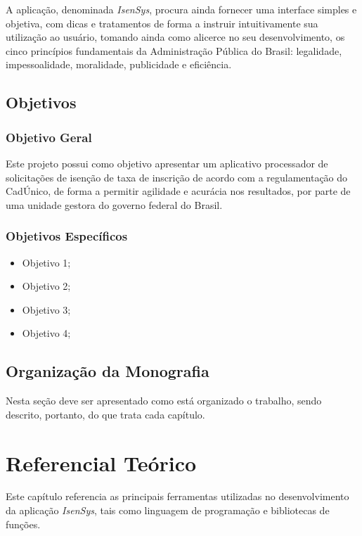 \documentclass[
	12pt,			%
	openright,		%
	oneside,	
	a4paper,		%
	english,		%
	brazil			%
]{abntex2/abntex2}  %
\begin{document}
	A aplicação, denominada \textit{IsenSys}, procura ainda fornecer uma interface simples e objetiva, com dicas e tratamentos de forma a instruir intuitivamente sua utilização ao usuário, tomando ainda como alicerce no seu desenvolvimento, os cinco princípios fundamentais da Administração Pública do Brasil: legalidade, impessoalidade, moralidade, publicidade e eficiência.

	\section{Objetivos}
	
		\subsection{Objetivo Geral}
		
		Este projeto possui como objetivo apresentar um aplicativo processador de solicitações de isenção de taxa de inscrição de acordo com a regulamentação do CadÚnico, de forma a permitir agilidade e acurácia nos resultados, por parte de uma unidade gestora do governo federal do Brasil.
		
		\subsection{Objetivos Específicos}
		
		\begin{itemize}
			
			\item Objetivo 1;
			\item Objetivo 2;
			\item Objetivo 3;
			\item Objetivo 4;
			
		\end{itemize}
		
	\section{Organização da Monografia}
	
		Nesta seção deve ser apresentado como está organizado o trabalho, sendo descrito, portanto, do que trata cada capítulo.

\chapter{Referencial Teórico}

	Este capítulo referencia as principais ferramentas utilizadas no desenvolvimento da aplicação \textit{IsenSys}, tais como linguagem de programação e bibliotecas de funções.
	
\end{document}
